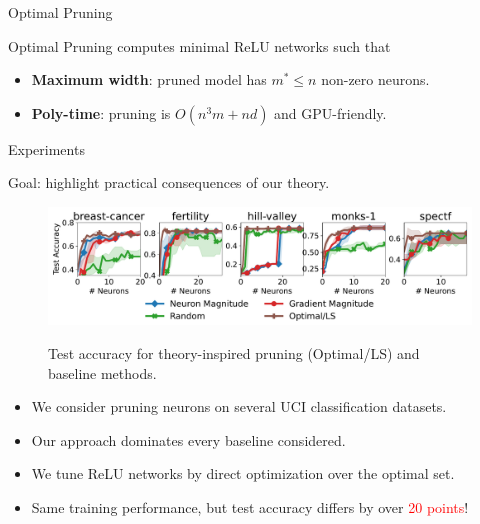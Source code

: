 \documentclass[12pt, usenames, dvipsnames]{beamer}
\newlength{\colwidth}
\newcommand{\red}[1]{\textcolor{Red}{#1}}
\newcommand{\blue}[1]{\textcolor{CBBlue}{#1}}
\begin{document}
\begin{frame}[t]
\begin{columns}[t]
\begin{column}{\colwidth}
\begin{block}{Optimal Pruning}
				\vspace{0.5em}

				

				\blue{Optimal Pruning} computes minimal ReLU networks such that
				\vspace{-0.5em}
				\begin{itemize}
					\item \textbf{Maximum width}: pruned model has \( m^* \leq n \) non-zero neurons.
					\item \textbf{Poly-time}: pruning is \( O(n^3 m + n d) \) and GPU-friendly.
				\end{itemize}

			\end{block}
			\vspace{-1em}
			\begin{block}{Experiments}
				\large

				{\Large \blue{Goal}: highlight practical consequences of our theory.}

				\begin{figure}[]
					\centering
					\includegraphics[width=\textwidth]{assets/uci_pruning_acc.pdf}
					\label{fig:purning}
					\vspace{-2em}
					\caption{Test accuracy for theory-inspired pruning (Optimal/LS) and baseline methods.}
				\end{figure}
				\vspace{-0.5em}
				\begin{itemize}
					\item We consider pruning neurons on several UCI
					      classification datasets.
					\item Our approach \blue{dominates} every baseline considered.
				\end{itemize}

				\vspace{-0.5em}
				
				\begin{itemize}
					\item We tune ReLU networks by direct optimization over the optimal set.
					\item Same training performance, but test accuracy differs by over \red{20 points}!
				\end{itemize}


\end{block}
\end{column}
\end{columns}
\end{frame}
\end{document}
